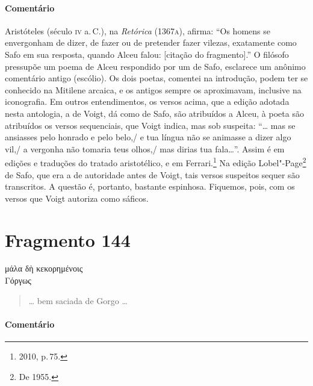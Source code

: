 \medskip

\paragraph{Comentário} Aristóteles (século \textsc{iv} a.\,C.), na \emph{Retórica} (1367\textsc{a}), afirma: ``Os homens se envergonham de dizer, de fazer ou de pretender fazer vilezas, exatamente 
como Safo em sua resposta, quando Alceu falou: [citação do fragmento].''
O filósofo pressupõe um poema de Alceu respondido por um de Safo, esclarece um anônimo comentário antigo (escólio). Os
dois poetas, comentei na introdução, podem ter se conhecido na Mitilene arcaica, e
os antigos sempre os aproximavam, inclusive na iconografia.
Em outros entendimentos, os versos acima, que a edição adotada nesta antologia, a de Voigt, dá como de Safo, são atribuídos a Alceu, à poeta são atribuídos os versos sequenciais, que Voigt indica, mas sob suspeita: ``\ldots{} mas se ansiasses pelo honrado e pelo belo,/ e tua língua não se animasse a dizer algo vil,/ a vergonha não tomaria teus olhos,/ mas dirias tua fala\ldots{}''. Assim é em edições e traduções do tratado aristotélico, e em Ferrari.\footnote{2010, p.\,75.} Na edição Lobel"-Page\footnote{De 1955.} de Safo, que era a de autoridade antes de Voigt, tais versos suspeitos sequer são transcritos. A questão é, portanto, bastante espinhosa. Fiquemos, pois, com os versos que Voigt autoriza como sáficos.

\section{Fragmento 144}

\begin{gkverse}
μάλα δὴ κεκορημένοις\\
Γόργως
\end{gkverse}

\begin{verse}
\ldots{} bem saciada de Gorgo \ldots{}
\end{verse}

\medskip

\paragraph{Comentário} 

